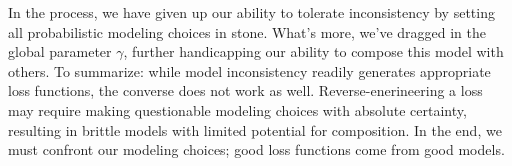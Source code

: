 \documentclass[twoside]{article}
\theoremstyle{plain}
\theoremstyle{definition}
\begin{document}
In the process, we have given up our ability to tolerate inconsistency by setting all probabilistic modeling choices in stone.
What's more, we've dragged in the global parameter $\gamma$,
further handicapping our ability to compose this model with others.
To summarize: while model inconsistency readily generates appropriate loss functions,
the converse does not work as well.
Reverse-enerineering a loss may require making questionable modeling choices with absolute
certainty, resulting in brittle models with limited potential for composition.
In the end, we must confront our modeling choices;
good loss functions come from good models.
\end{document}
